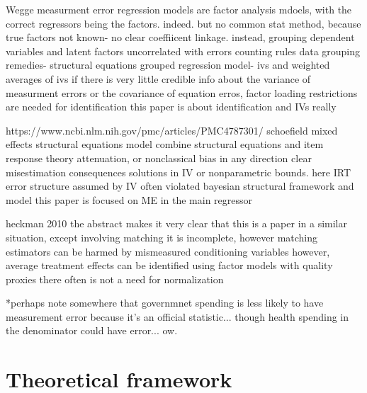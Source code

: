 \documentclass[12pt]{article}
\begin{document}
        Wegge
        measurment error regression models are factor analysis mdoels, with the correct regressors being the factors. indeed. but no common stat method, because true factors not known- no clear coeffiicent linkage. instead, grouping
        dependent variables and latent factors uncorrelated with errors
        counting rules
        data grouping remedies- structural equations
        grouped regression model- ivs and weighted averages of ivs
        if there is very little credible info about the variance of measurment errors or the covariance of equation erros, factor loading restrictions are needed for identification
        this paper is about identification and IVs really

        https://www.ncbi.nlm.nih.gov/pmc/articles/PMC4787301/
        schoefield
        mixed effects structural equations model
        combine structural equations and item response theory
        attenuation, or nonclassical bias in any direction
        clear misestimation consequences
        solutions in IV or nonparametric bounds. here IRT
        error structure assumed by IV often violated
        bayesian structural framework and model
        this paper is focused on ME in the main regressor

        heckman 2010
        the abstract makes it very clear that this is a paper in a similar situation, except involving matching
        it is incomplete, however
        matching estimators can be harmed by mismeasured conditioning variables
        however, average treatment effects can be identified using factor models with quality proxies
        there often is not a need for normalization

        *perhaps note somewhere that governmnet spending is less likely to have measurement error because it's an official statistic... though health spending in the denominator could have error... ow.

    \section*{Theoretical framework}
\end{document}
